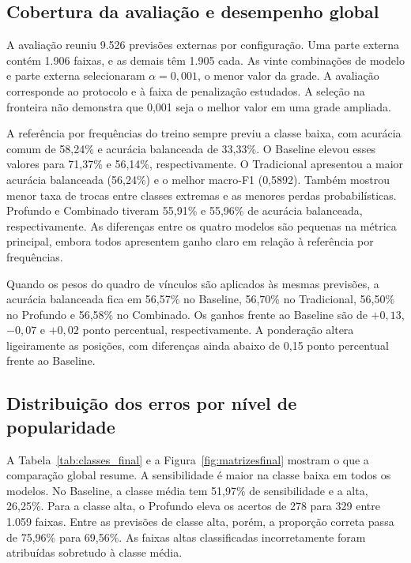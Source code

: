 \subsection{Cobertura da avaliação e desempenho global}
A avaliação reuniu 9.526 previsões externas por configuração. Uma parte externa contém 1.906 faixas, e as demais têm 1.905 cada. As vinte combinações de modelo e parte externa selecionaram $\alpha=0,001$, o menor valor da grade. A avaliação corresponde ao protocolo e à faixa de penalização estudados. A seleção na fronteira não demonstra que 0,001 seja o melhor valor em uma grade ampliada.



A referência por frequências do treino sempre previu a classe baixa, com acurácia comum de 58,24\% e acurácia balanceada de 33,33\%. O Baseline elevou esses valores para 71,37\% e 56,14\%, respectivamente. O Tradicional apresentou a maior acurácia balanceada (56,24\%) e o melhor macro-F1 (0,5892). Também mostrou menor taxa de trocas entre classes extremas e as menores perdas probabilísticas. Profundo e Combinado tiveram 55,91\% e 55,96\% de acurácia balanceada, respectivamente. As diferenças entre os quatro modelos são pequenas na métrica principal, embora todos apresentem ganho claro em relação à referência por frequências.

Quando os pesos do quadro de vínculos são aplicados às mesmas previsões, a acurácia balanceada fica em 56,57\% no Baseline, 56,70\% no Tradicional, 56,50\% no Profundo e 56,58\% no Combinado. Os ganhos frente ao Baseline são de $+0,13$, $-0,07$ e $+0,02$ ponto percentual, respectivamente. A ponderação altera ligeiramente as posições, com diferenças ainda abaixo de 0,15 ponto percentual frente ao Baseline.

\subsection{Distribuição dos erros por nível de popularidade}
A Tabela~\ref{tab:classes_final} e a Figura~\ref{fig:matrizesfinal} mostram o que a comparação global resume. A sensibilidade é maior na classe baixa em todos os modelos. No Baseline, a classe média tem 51,97\% de sensibilidade e a alta, 26,25\%. Para a classe alta, o Profundo eleva os acertos de 278 para 329 entre 1.059 faixas. Entre as previsões de classe alta, porém, a proporção correta passa de 75,96\% para 69,56\%. As faixas altas classificadas incorretamente foram atribuídas sobretudo à classe média.


